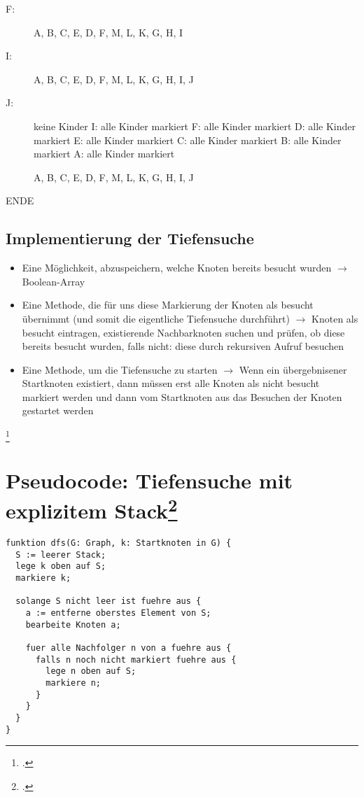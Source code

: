 \documentclass{lehramt-informatik-haupt}
\begin{document}
\begin{description}
\item[F:]
A, B, C, E, D, F, M, L, K, G, H, I

\item[I:]
A, B, C, E, D, F, M, L, K, G, H, I, J

\item[J:] keine Kinder
I: alle Kinder markiert
F: alle Kinder markiert
D: alle Kinder markiert
E: alle Kinder markiert
C: alle Kinder markiert
B: alle Kinder markiert
A: alle Kinder markiert

A, B, C, E, D, F, M, L, K, G, H, I, J

\end{description}

ENDE

\subsection{Implementierung der Tiefensuche}

\begin{itemize}
\item Eine Möglichkeit, abzuspeichern, welche Knoten bereits besucht
wurden $\rightarrow$ Boolean-Array

\item Eine Methode, die für uns diese Markierung der Knoten als besucht
übernimmt (und somit die eigentliche Tiefensuche durchführt)
$\rightarrow$  Knoten als besucht eintragen, existierende Nachbarknoten
suchen und prüfen, ob diese bereits besucht wurden, falls nicht: diese
durch rekursiven Aufruf besuchen

\item Eine Methode, um die Tiefensuche zu starten $\rightarrow$  Wenn
ein übergebnisener Startknoten existiert, dann müssen erst alle Knoten
als nicht besucht markiert werden und dann vom Startknoten aus das
Besuchen der Knoten gestartet werden
\end{itemize}
\footcite[Seite 45 (PDF 45)]{aud:fs:6}

\section{Pseudocode: Tiefensuche mit explizitem Stack\footcite[Seite 51 (PDF 45)]{aud:fs:6}}

\begin{verbatim}
funktion dfs(G: Graph, k: Startknoten in G) {
  S := leerer Stack;
  lege k oben auf S;
  markiere k;

  solange S nicht leer ist fuehre aus {
    a := entferne oberstes Element von S;
    bearbeite Knoten a;

    fuer alle Nachfolger n von a fuehre aus {
      falls n noch nicht markiert fuehre aus {
        lege n oben auf S;
        markiere n;
      }
    }
  }
}
\end{verbatim}
\end{document}
